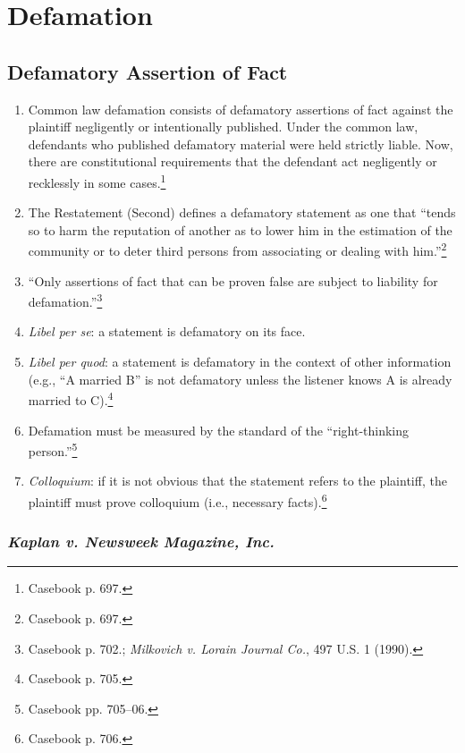 \section{Defamation}

\subsection{Defamatory Assertion of Fact}

\begin{enumerate}
    \item Common law defamation consists of defamatory assertions of fact 
    against the plaintiff negligently or intentionally published. Under the 
    common law, defendants who published defamatory material were held 
    strictly liable. Now, there are constitutional requirements that the 
    defendant act negligently or recklessly in some cases.\footnote{Casebook p. 697.}
    \item The Restatement (Second) defines a defamatory statement as one that 
    ``tends so to harm the reputation of another as to lower him in the 
    estimation of the community or to deter third persons from associating or 
    dealing with him.''\footnote{Casebook p. 697.}
    \item ``Only assertions of fact that can be proven false are subject to 
    liability for defamation.''\footnote{Casebook p. 702.; \emph{Milkovich v. 
    Lorain Journal Co.}, 497 U.S. 1 (1990).}
    \item \emph{Libel per se}: a statement is defamatory on its face.
    \item \emph{Libel per quod}: a statement is defamatory in the context of 
    other information (e.g., ``A married B'' is not defamatory unless the 
    listener knows A is already married to C).\footnote{Casebook p. 705.}
    \item Defamation must be measured by the standard of the ``right-thinking 
    person.''\footnote{Casebook pp. 705--06.}
    \item \emph{Colloquium}: if it is not obvious that the statement refers to 
    the plaintiff, the plaintiff must prove colloquium (i.e., necessary 
    facts).\footnote{Casebook p. 706.}
\end{enumerate}

\subsubsection{\emph{Kaplan v. Newsweek Magazine, Inc.}}

